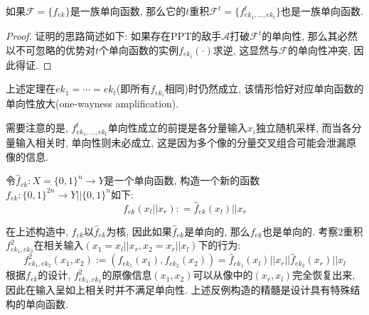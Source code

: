 \begin{center}
\end{center}

\begin{theorem}
如果$\mathcal{F} = \{f_{ek}\}$是一族单向函数, 那么它的$t$重积$\mathcal{F}^t = \{f^t_{ek_1, \dots, ek_t}\}$也是一族单向函数. 
\end{theorem}

\begin{proof}
证明的思路简述如下: 如果存在PPT的敌手$\mathcal{A}$打破$\mathcal{F}^t$的单向性, 
那么其必然以不可忽略的优势对$t$个单向函数的实例$f_{ek_i}(\cdot)$求逆, 这显然与$\mathcal{F}$的单向性冲突, 因此得证. 
\end{proof}

\begin{remark}
上述定理在$ek_1 = \cdots = ek_t$(即所有$f_{ek_i}$相同)时仍然成立, 该情形恰好对应单向函数的单向性放大(one-wayness amplification).  
\end{remark}

需要注意的是, $f^t_{ek_1, \dots, ek_t}$单向性成立的前提是各分量输入$x_i$独立随机采样, 
而当各分量输入相关时, 单向性则未必成立, 这是因为多个像的分量交叉组合可能会泄漏原像的信息. 

\begin{construction}[反例构造]\label{counterexample:CPTDF}
令$\hat{f}_{ek}: X = \{0,1\}^n \rightarrow Y$是一个单向函数, 
构造一个新的函数$f_{ek}: \{0,1\}^{2n} \rightarrow Y||\{0,1\}^n$如下: 
\begin{equation*}
    f_{ek}(x_l||x_r): = \hat{f}_{ek}(x_l)||x_r
\end{equation*}
\end{construction}
在上述构造中, $f_{ek}$以$\hat{f}_{ek}$为核, 因此如果$\hat{f}_{ek}$是单向的, 那么$f_{ek}$也是单向的. 
考察2重积$f^2_{ek_1, ek_2}$在相关输入$(x_1 = x_l||x_r, x_2 =  x_r||x_l)$下的行为: 
\begin{equation*}
    f^2_{ek_1, ek_2}(x_1, x_2) := (f_{ek_1}(x_1), f_{ek_2}(x_2)) 
        = \hat{f}_{ek_1}(x_l)||x_r||\hat{f}_{ek_2}(x_r)||x_l 
\end{equation*}
根据$f_{ek}$的设计, $f^2_{ek_1, ek_2}$的原像信息$(x_1, x_2)$可以从像中的$(x_r, x_l)$完全恢复出来, 
因此在输入呈如上相关时并不满足单向性. 上述反例构造的精髓是设计具有特殊结构的单向函数. 

